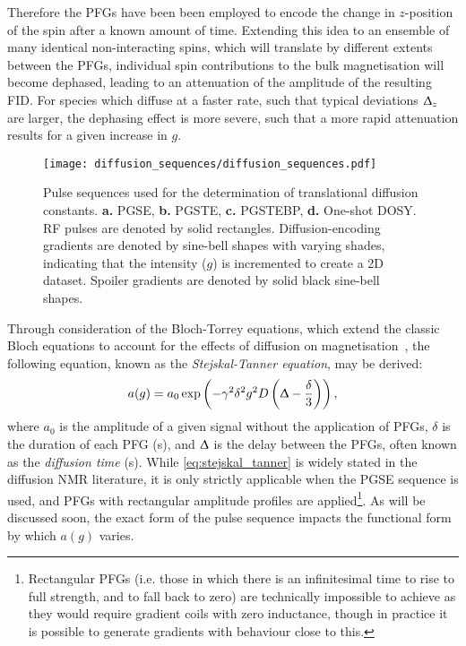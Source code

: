 Therefore the \acp{PFG} have been been employed to encode the
change in $z$-position of the spin after a known amount of time.
Extending this idea to an ensemble of many identical non-interacting spins,
which will translate by different extents between the \acp{PFG}, individual
spin contributions to the bulk magnetisation will become dephased, leading to
an attenuation of the amplitude of the resulting \ac{FID}. For species which
diffuse at a faster rate, such that typical deviations $\Updelta_z$ are
larger, the dephasing effect is more severe, such that a more rapid attenuation
results for a given increase in $g$.

\begin{figure}
   \texttt{[image: diffusion\_sequences/diffusion\_sequences.pdf]}
   \caption[
       Pulse sequences used for the determination of translational diffusion constants.
   ]{
       Pulse sequences used for the determination of translational diffusion constants.
       \textbf{a.} \acs{PGSE},
       \textbf{b.} \acs{PGSTE},
       \textbf{c.} \acs{PGSTEBP},
       \textbf{d.} One-shot DOSY.
       \ac{RF} pulses are denoted by solid rectangles. Diffusion-encoding
       gradients are denoted by sine-bell shapes with varying shades,
       indicating that the intensity ($g$) is incremented to create a \ac{2D}
       dataset. Spoiler gradients are denoted by solid black sine-bell shapes.
   }
   \label{fig:diffusion_sequences}
\end{figure}

Through consideration of the Bloch-Torrey equations, which
extend the classic Bloch equations to account for the effects of diffusion on
magnetisation~\cite{Torrey1956}, the following equation, known as the
\emph{Stejskal-Tanner equation}, may be derived:
\begin{equation}
    a(g) = a_0 \exp \left(- \gamma^2 \delta^2 g^2 D \left(\Updelta -
    \frac{\delta}{3}\right)\right),
    \label{eq:stejskal_tanner}
\end{equation}
where
$a_0$ is the amplitude of a given signal without the application of \acp{PFG},
$\delta$ is the duration of each \ac{PFG} (\unit{\second}), and
$\Updelta$ is the delay between the \acp{PFG}, often known as the \emph{diffusion time}
(\unit{\second}).
While \cref{eq:stejskal_tanner} is widely stated in the diffusion \ac{NMR}
literature, it is only strictly applicable when the \ac{PGSE} sequence is used,
and \acp{PFG} with rectangular amplitude profiles are applied\footnote{
    Rectangular \acp{PFG} (i.e. those in which there is an infinitesimal time
    to rise to full strength, and to fall back to zero) are technically
    impossible to achieve as they would require gradient coils with zero
    inductance, though in practice it is possible to generate gradients with
    behaviour close to this.
}. As will be discussed soon, the exact form of the pulse sequence impacts the
functional form by which $a(g)$ varies.

